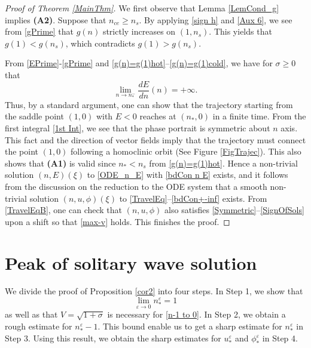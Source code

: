 \documentclass{amsart}
\newcommand{\veps}{\varepsilon}
\numberwithin{equation}{section}
\theoremstyle{plain}%
\theoremstyle{definition}
\theoremstyle{remark}
\theoremstyle{remark}
\begin{document}
\begin{proof}[Proof of Theorem \ref{MainThm}]
We first observe that Lemma \ref{LemCond_g} implies \textbf{(A2)}. Suppose that $n_{ce} \geq n_s$. By applying  \eqref{sign h} and \eqref{Aux 6}, we see from \eqref{gPrime} that $g(n)$ strictly increases on $(1,n_s)$. This yields that $g(1) < g(n_s)$, which contradicts $g(1)>g(n_s)$.

From \eqref{EPrime}-\eqref{gPrime} and  \eqref{g(n)=g(1)hot}--\eqref{g(n)=g(1)cold}, we have for $\sigma \geq 0$ that
\[
\lim_{n \to n_\ast^-}\frac{dE}{dn}(n) = +\infty.
\]
Thus, by a standard argument, one can show that the trajectory starting from the saddle point $(1,0)$ with $E<0$ reaches at $(n_\ast,0)$ in a finite time. From the first integral \eqref{1st Int}, we see that the phase portrait is symmetric about $n$ axis. This fact and the direction of vector fields imply that the trajectory must connect the point $(1,0)$ following a homoclinic orbit (See Figure \ref{FigTrajec}). This also shows that \textbf{(A1)} is valid since  $n_\ast < n_s$ from \eqref{g(n)=g(1)hot}. Hence a non-trivial solution $(n,E)(\xi)$ to \eqref{ODE_n_E} with \eqref{bdCon n E} exists, and it follows from the discussion on the reduction to the ODE system that a smooth non-trivial solution $(n,u,\phi)(\xi)$ to \eqref{TravelEq}--\eqref{bdCon+-inf} exists. From \eqref{TravelEqB}, one can check that $(n,u,\phi)$ also satisfies \eqref{Symmetric}--\eqref{SignOfSols} upon a shift so that \eqref{max-v} holds. This finishes the proof.
\end{proof}

\section{Peak of solitary wave solution}
We divide the proof of Proposition \ref{cor2} into four steps. In Step 1, we show that
 \begin{equation}\label{n-1 to 0}
\lim_{\veps \to 0}n_\ast^\veps = 1
\end{equation} 
as well as that $V=\sqrt{1+\sigma}$ is necessary for \eqref{n-1 to 0}. In Step 2, we obtain a rough estimate for $n_\ast^\veps-1$. This bound enable us to get a sharp estimate for $n_\ast^\veps$ in Step 3. Using this result, we obtain the sharp estimates for $u_\ast^\veps$ and $\phi_\ast^\veps$ in Step 4.
\end{document}
